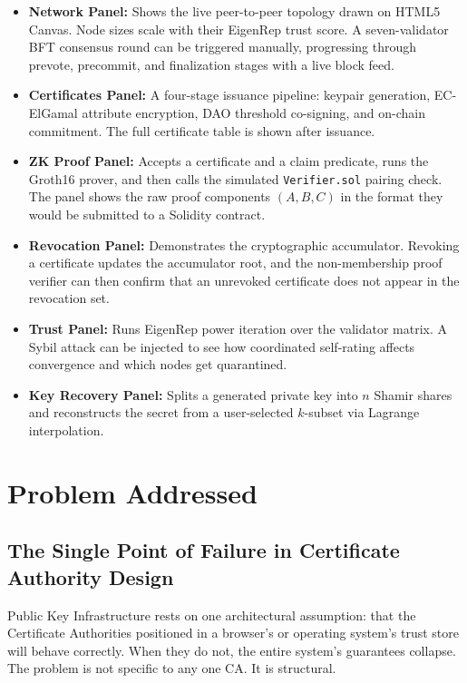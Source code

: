\documentclass[12pt,a4paper]{article}
\begin{document}
\begin{itemize}
    \item \textbf{Network Panel:} Shows the live peer-to-peer topology drawn on HTML5 Canvas. Node sizes scale with their EigenRep trust score. A seven-validator BFT consensus round can be triggered manually, progressing through prevote, precommit, and finalization stages with a live block feed.
    \item \textbf{Certificates Panel:} A four-stage issuance pipeline: keypair generation, EC-ElGamal attribute encryption, DAO threshold co-signing, and on-chain commitment. The full certificate table is shown after issuance.
    \item \textbf{ZK Proof Panel:} Accepts a certificate and a claim predicate, runs the Groth16 prover, and then calls the simulated \texttt{Verifier.sol} pairing check. The panel shows the raw proof components $(A, B, C)$ in the format they would be submitted to a Solidity contract.
    \item \textbf{Revocation Panel:} Demonstrates the cryptographic accumulator. Revoking a certificate updates the accumulator root, and the non-membership proof verifier can then confirm that an unrevoked certificate does not appear in the revocation set.
    \item \textbf{Trust Panel:} Runs EigenRep power iteration over the validator matrix. A Sybil attack can be injected to see how coordinated self-rating affects convergence and which nodes get quarantined.
    \item \textbf{Key Recovery Panel:} Splits a generated private key into $n$ Shamir shares and reconstructs the secret from a user-selected $k$-subset via Lagrange interpolation.
\end{itemize}

\section{Problem Addressed}

\subsection{The Single Point of Failure in Certificate Authority Design}

Public Key Infrastructure rests on one architectural assumption: that the Certificate Authorities positioned in a browser's or operating system's trust store will behave correctly. When they do not, the entire system's guarantees collapse. The problem is not specific to any one CA. It is structural.
\end{document}
